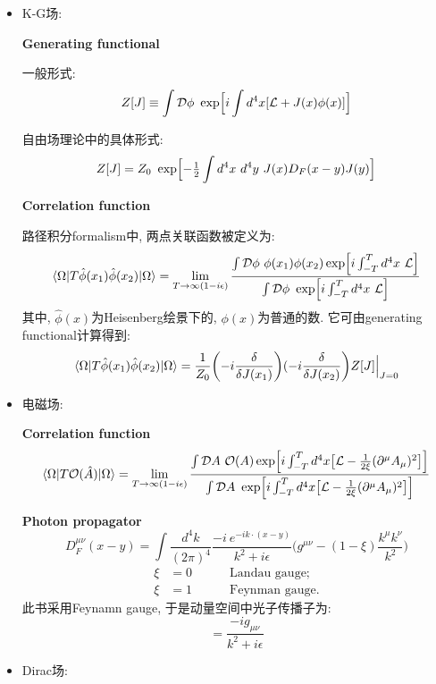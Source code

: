 \begin{itemize}
  \item K-G场:

        \textbf{Generating functional}

        一般形式:
        \begin{equation*}
          Z[J]\equiv\int \mathcal{D}\phi\ \exp\Bigl[i\int d^4x[\mathcal{L}+J(x)\phi(x)]\Bigr]
        \end{equation*}

        自由场理论中的具体形式:
        \begin{equation*}
          Z[J] = Z_0\ \exp\Bigl[-\tfrac{1}{2}\int d^4x\ d^4y\ J(x)D_F(x-y)J(y)\Bigr]
        \end{equation*}

        \textbf{Correlation function}

        路径积分formalism中, 两点关联函数被定义为:
        \begin{equation*}
          \langle \Omega|T\hat{\phi}(x_1)\hat{\phi}(x_2)|\Omega \rangle = \lim_{T\rightarrow \infty(1-i\epsilon)}\frac{\int \mathcal{D}\phi\ \phi(x_1)\phi(x_2)\exp\Bigl[i\int_{-T}^{T}d^4x\ \mathcal{L}\Bigr]}{\int \mathcal{D}\phi\ \exp\Bigl[i\int_{-T}^{T}d^4x\ \mathcal{L}\Bigr]}
        \end{equation*}
        其中, $\hat{\phi}(x)$为Heisenberg绘景下的, $\phi(x)$为普通的数.
        它可由generating functional计算得到:
        \begin{equation*}
          \langle \Omega|T\hat{\phi}(x_1)\hat{\phi}(x_2)|\Omega \rangle = \frac{1}{Z_0}\biggl(-i\frac{\delta}{\delta J(x_1)}\biggr)(-i\frac{\delta}{\delta J(x_2)}\biggr)Z[J]\Bigl| _{J=0}
        \end{equation*}
  \item 电磁场:

        \textbf{Correlation function}
        \begin{equation*}
          \langle \Omega|T \mathcal{O}(\hat{A})|\Omega \rangle = \lim_{T\rightarrow \infty(1-i\epsilon)}\frac{\int \mathcal{D}A\ \mathcal{O}(A)\exp\Bigl[i\int_{-T}^{T}d^4x \bigl[\mathcal{L} - \frac{1}{2\xi}(\partial^{\mu}A_\mu)^2\bigr]\Bigr]}{\int \mathcal{D}A\ \exp\Bigl[i\int_{-T}^{T}d^4x \bigl[\mathcal{L} - \frac{1}{2\xi}(\partial^{\mu}A_\mu)^2\bigr]\Bigr]}
        \end{equation*}

        \textbf{Photon propagator}
        \begin{equation*}
          D^{\mu\nu}_F(x-y) = \int \frac{d^4k}{(2\pi)^4} \frac{-i\ e^{-ik\cdot(x-y)}}{k^2+i\epsilon}\biggl(g^{\mu\nu}-(1-\xi)\frac{k^\mu k^\nu}{k^2}\biggr)
        \end{equation*}
        \begin{align*}
          \xi & = 0\qquad\quad\text{Landau gauge};  \\
          \xi & = 1\qquad\quad\text{Feynman gauge}.
        \end{align*}
        此书采用Feynamn gauge, 于是动量空间中光子传播子为:
        \begin{equation*}
          = \frac{-ig_{\mu\nu}}{k^2 + i\epsilon}
        \end{equation*}
  \item Dirac场:


\end{itemize}
